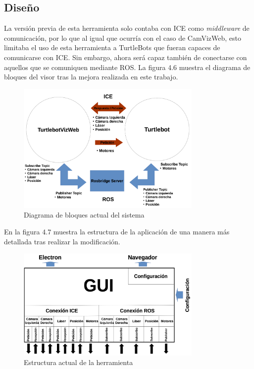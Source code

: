 \subsection{Diseño}
La versión previa de esta herramienta solo contaba con ICE como \textit{middleware} de comunicación, por lo que al igual que ocurría con el caso de CamVizWeb, esto limitaba el uso de esta herramienta a TurtleBots que fueran capaces de comunicarse con ICE. Sin embargo, ahora será capaz también de conectarse con aquellos que se comuniquen mediante ROS. La figura 4.6 muestra el diagrama de bloques del visor tras la mejora realizada en este trabajo.

\begin{figure}[H]
  \begin{center}
    \includegraphics[width=0.8\textwidth]{figures/TurtleBot2.png}
		\caption{Diagrama de bloques actual del sistema}
		\label{fig.esquemaTurtleBot2}
		\end{center}
\end{figure}

En la figura 4.7 muestra la estructura de la aplicación de una manera más detallada tras realizar la modificación.

\begin{figure}[H]
  \begin{center}
    \includegraphics[width=0.8\textwidth]{figures/estrucuturaTurtleBotviz2.png}
		\caption{Estructura actual de la herramienta}
		\label{fig.estructuracamviz2}
		\end{center}
\end{figure}

